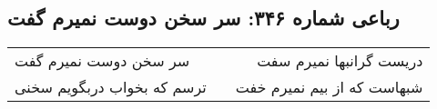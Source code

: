 \begin{center}
\section*{رباعی شماره ۳۴۶: سر سخن دوست نمیرم گفت}
\label{sec:0346}
\begin{longtable}{l p{0.5cm} r}
سر سخن دوست نمیرم گفت
&&
دریست گرانبها نمیرم سفت
\\
ترسم که بخواب دربگویم سخنی
&&
شبهاست که از بیم نمیرم خفت
\\
\end{longtable}
\end{center}
